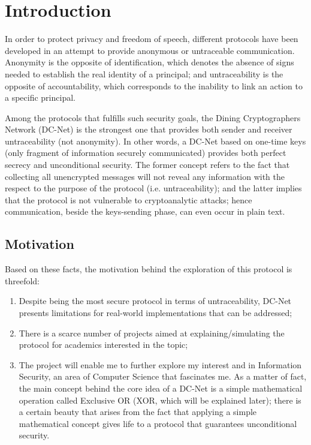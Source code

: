 \chapter{Introduction}


In order to protect privacy and freedom of speech, different protocols have been developed in an attempt to provide anonymous or untraceable communication. Anonymity is the opposite of identification, which denotes the absence of signs needed to establish the real identity of a principal; and untraceability is the opposite of accountability, which corresponds to the inability to link an action to a specific principal.

Among the protocols that fulfills such security goals, the Dining Cryptographers Network (DC-Net) is the strongest one that provides both sender and receiver untraceability (not anonymity). In other words, a DC-Net based on one-time keys (only fragment of information securely communicated) provides both perfect secrecy and unconditional security. The former concept refers to the fact that collecting all unencrypted messages will not reveal any information with the respect to the purpose of the protocol (i.e. untraceability); and the latter implies that the protocol is not vulnerable to cryptoanalytic attacks; hence communication, beside the keys-sending phase, can even occur in plain text.

\section{Motivation}
Based on these facts, the motivation behind the exploration of this protocol is threefold:

\begin{enumerate}
\item Despite being the most secure protocol in terms of untraceability, DC-Net presents limitations for real-world implementations that can be addressed;

\item There is a scarce number of projects aimed at explaining/simulating the protocol for academics interested in the topic;

\item The project will enable me to further explore my interest and in Information Security, an area of Computer Science that fascinates me. As a matter of fact, the main concept behind the core idea of a DC-Net is a simple mathematical operation called Exclusive OR (XOR, which will be explained later); there is a certain beauty that arises from the fact that applying a simple mathematical concept gives life to a protocol that guarantees unconditional security.

\end{enumerate}


